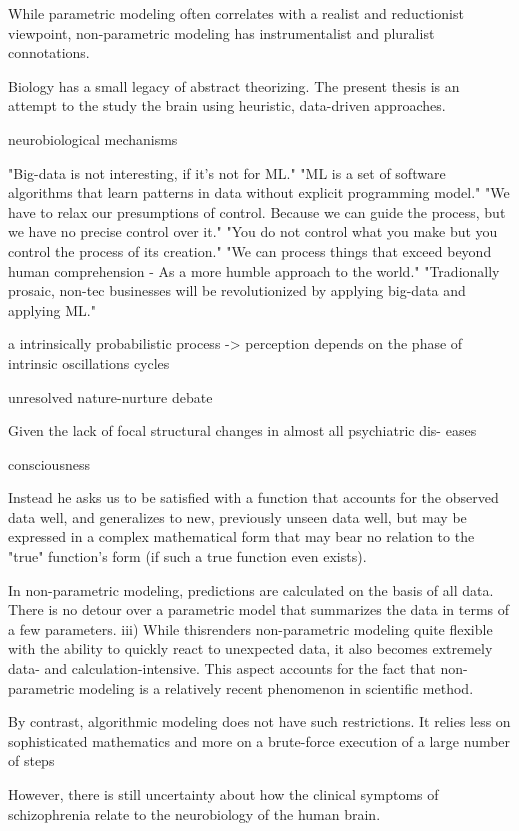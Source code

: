 \documentclass[authoryear,review,3p]{elsarticle}
\begin{document}
While parametric modeling often correlates with a realist and reductionist viewpoint, non-parametric modeling has instrumentalist and pluralist connotations.

Biology has a small legacy of abstract theorizing.
The present thesis is an attempt to the study the brain using
heuristic, data-driven approaches.

neurobiological mechanisms

"Big-data is not interesting, if it's not for ML."
"ML is a set of software algorithms that learn patterns in data without explicit programming model."
"We have to relax our presumptions of control. Because we can guide the process, but we have no precise control over it." "You do not control what you make but you control the process of its creation."
"We can process things that exceed beyond human comprehension - As a more humble approach to the world." "Tradionally prosaic, non-tec businesses will be revolutionized by applying big-data and applying ML."


a intrinsically probabilistic process
-> perception depends on the phase of intrinsic oscillations cycles

unresolved nature-nurture debate

Given the lack of focal structural changes in almost all psychiatric dis- eases

consciousness

Instead he asks us to be satisfied with a function that
accounts for the observed data well, and generalizes to new,
previously unseen data well, but may be expressed in a complex mathematical
form that may bear no relation to the "true" function's form
(if such a true function even exists).


In non-parametric modeling, predictions are calculated on the basis of all data. There is no detour over a parametric model that summarizes the data in terms of a few parameters. iii) While thisrenders non-parametric modeling quite flexible with the ability to quickly react to unexpected data, it also becomes extremely data- and calculation-intensive. This aspect accounts for the fact that non-parametric modeling is a relatively recent phenomenon in scientific method.

By contrast, algorithmic modeling does not have such restrictions. It relies less on sophisticated mathematics and more on a brute-force execution of a large number of steps

However, there is still uncertainty about how the clinical symptoms of schizophrenia relate to the neurobiology of the human brain. 
\end{document}
